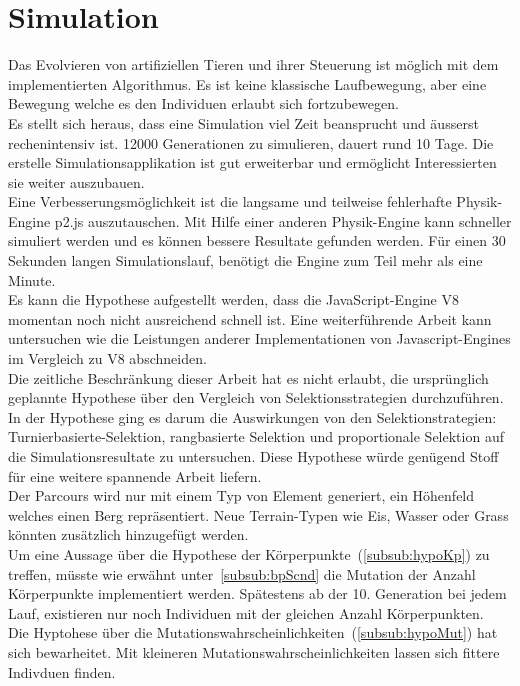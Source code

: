   \section{Simulation}
    Das Evolvieren von artifiziellen Tieren und ihrer Steuerung ist möglich mit dem implementierten Algorithmus.
    Es ist keine klassische Laufbewegung, aber eine Bewegung welche es den Individuen erlaubt sich fortzubewegen.
    \\
    Es stellt sich heraus, dass eine Simulation viel Zeit beansprucht und äusserst rechenintensiv ist.
    12000 Generationen zu simulieren, dauert rund 10 Tage.
    Die erstelle Simulationsapplikation ist gut erweiterbar und ermöglicht Interessierten sie weiter auszubauen.
    \\
    Eine Verbesserungsmöglichkeit ist die langsame und teilweise fehlerhafte Physik-Engine p2.js auszutauschen.
    Mit Hilfe einer anderen Physik-Engine kann schneller simuliert werden und es können bessere Resultate gefunden werden.
    Für einen 30 Sekunden langen Simulationslauf, benötigt die Engine zum Teil mehr als eine Minute.
    \\
    Es kann die Hypothese aufgestellt werden, dass die JavaScript-Engine V8 momentan noch nicht ausreichend schnell ist.
    Eine weiterführende Arbeit kann untersuchen wie die Leistungen anderer Implementationen von Javascript-Engines im
    Vergleich zu V8 abschneiden.
    \\
    Die zeitliche Beschränkung dieser Arbeit hat es nicht erlaubt,
    die ursprünglich geplannte Hypothese über den Vergleich von Selektionsstrategien durchzuführen.
    In der Hypothese ging es darum die Auswirkungen von den Selektionstrategien: Turnierbasierte-Selektion, rangbasierte Selektion
    und proportionale Selektion auf die Simulationsresultate zu untersuchen.
    Diese Hypothese würde genügend Stoff für eine weitere spannende Arbeit liefern.
    \\
    Der Parcours wird nur mit einem Typ von Element generiert, ein Höhenfeld welches einen Berg repräsentiert.
    Neue Terrain-Typen wie Eis, Wasser oder Grass könnten zusätzlich hinzugefügt werden.
    \\
    Um eine Aussage über die Hypothese der Körperpunkte~(\vref{subsub:hypoKp}) zu treffen,
    müsste wie erwähnt unter~\vref{subsub:bpScnd} die Mutation der Anzahl Körperpunkte implementiert werden.
    Spätestens ab der 10. Generation bei jedem Lauf, existieren nur noch Individuen mit der gleichen Anzahl Körperpunkten.
    \\
    Die Hyptohese über die Mutationswahrscheinlichkeiten~(\vref{subsub:hypoMut}) hat sich bewarheitet.
    Mit kleineren Mutationswahrscheinlichkeiten lassen sich fittere Indivduen finden.

